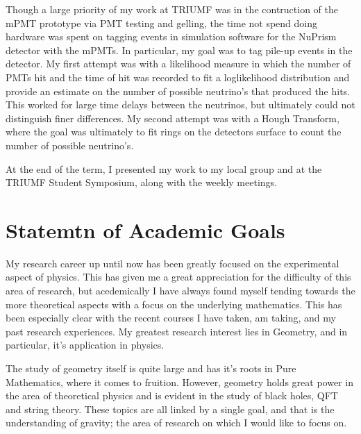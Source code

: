 \documentclass[11pt]{article}
\begin{document}
Though a large priority of my work at TRIUMF was in the contruction of the mPMT prototype via PMT testing and gelling, the time not spend doing hardware was spent on tagging events in simulation software for the NuPrism detector with the mPMTs. In particular, my goal was to tag pile-up events in the detector. My first attempt was with a likelihood measure in which the number of PMTs hit and the time of hit was recorded to fit a loglikelihood distribution and provide an estimate on the number of possible neutrino's that produced the hits. This worked for large time delays between the neutrinos, but ultimately could not distinguish finer differences. My second attempt was with a Hough Transform, where the goal was ultimately to fit rings on the detectors surface to count the number of possible neutrino's.

At the end of the term, I presented my work to my local group and at the TRIUMF Student Symposium, along with the weekly meetings.

\section{Statemtn of Academic Goals}
My research career up until now has been greatly focused on the experimental aspect of physics. This has given me a great appreciation for the difficulty of this area of research, but acedemically I have always found myself tending towards the more theoretical aspects with a focus on the underlying mathematics. This has been especially clear with the recent courses I have taken, am taking, and my past research experiences. My greatest research interest lies in Geometry, and in particular, it's application in physics.

The study of geometry itself is quite large and has it's roots in Pure Mathematics, where it comes to fruition. However, geometry holds great power in the area of theoretical physics and is evident in the study of black holes, QFT and string theory. These topics are all linked by a single goal, and that is the understanding of gravity; the area of research on which I would like to focus on.
\end{document}
